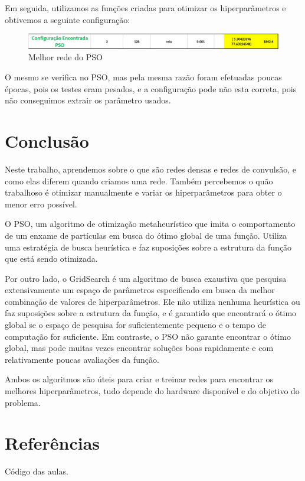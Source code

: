 \documentclass[10pt]{article}
\begin{document}
Em seguida, utilizamos as funções criadas para otimizar os hiperparâmetros e obtivemos 
a seguinte configuração:

\begin{figure}[htb]
  \centering
  \includegraphics[width=\linewidth]{img/pso.png}
  \caption{Melhor rede do PSO}
  \label{fig:pso}
\end{figure}

O mesmo se verifica no PSO, mas pela mesma razão foram efetuadas poucas épocas, pois os testes
eram pesados, e a configuração pode não esta correta, pois não conseguimos extrair 
os parâmetro usados.

\section{Conclusão}\label{sec:conc}

Neste trabalho, aprendemos sobre o que são redes densas e redes de convulsão, 
e como elas diferem quando criamos uma rede. Também percebemos o quão trabalhoso é 
otimizar manualmente e variar os hiperparâmetros para obter o menor erro possível.

O PSO, um algoritmo de otimização metaheurístico que imita o comportamento 
de um enxame de partículas em busca do ótimo global de uma função. Utiliza uma estratégia de 
busca heurística e faz suposições sobre a estrutura da função que está sendo otimizada. 

Por outro lado, o GridSearch é um algoritmo de busca exaustiva que pesquisa extensivamente 
um espaço de parâmetros especificado em busca da melhor combinação de valores de hiperparâmetros. Ele não utiliza nenhuma heurística ou faz suposições sobre a estrutura da função, e é garantido que encontrará o ótimo global se o espaço de pesquisa for suficientemente pequeno e o tempo de computação for suficiente. Em contraste, o PSO não garante encontrar o ótimo global, mas pode muitas vezes encontrar soluções boas rapidamente e com relativamente poucas avaliações da função.

Ambos os algoritmos são úteis para criar e treinar redes para encontrar os melhores 
hiperparâmetros, tudo depende do hardware disponível e do objetivo do problema.

\section{Referências}\label{sec:sup-inf-utl}


Código das aulas.



\pagebreak
\end{document}
